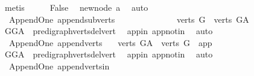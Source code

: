 \begin{isabellebody}
\ metis\isanewline
\ \ \isamarkupfalse%
\ \isamarkupfalse%
\ {\isachardoublequoteopen}False{\isachardoublequoteclose}\ \isamarkupfalse%
\ new{\isacharunderscore}{\kern0pt}node\ a{}\ \isamarkupfalse%
\ auto\isanewline
{}\isamarkupfalse%
%
\endisatagproof
{\isafoldproof}%
%
\isadelimproof
\isanewline
%
\endisadelimproof
\isanewline
\ \ \isanewline
\isanewline
\isanewline
{}\isamarkupfalse%
\ {\isacharparenleft}{\kern0pt}\ Append{\isacharunderscore}{\kern0pt}One{\isacharparenright}{\kern0pt}\ append{\isacharunderscore}{\kern0pt}subverts{\isacharcolon}{\kern0pt}\ \ \ \ \ \ \ \ \ \ \ \ \isanewline
\ \ {\isachardoublequoteopen}verts\ G\ {\isasymsubset}\ verts\ G{\isacharunderscore}{\kern0pt}A{\isachardoublequoteclose}\isanewline
%
\isadelimproof
\ \ %
\endisadelimproof
%
\isatagproof
{}\isamarkupfalse%
\ GG{\isacharunderscore}{\kern0pt}A\ \ pre{\isacharunderscore}{\kern0pt}digraph{\isachardot}{\kern0pt}verts{\isacharunderscore}{\kern0pt}del{\isacharunderscore}{\kern0pt}vert\ \isamarkupfalse%
\ app{\isacharunderscore}{\kern0pt}in\ app{\isacharunderscore}{\kern0pt}notin\ \isamarkupfalse%
\ auto%
\endisatagproof
{\isafoldproof}%
%
\isadelimproof
\isanewline
%
\endisadelimproof
\isanewline
{}\isamarkupfalse%
\ {\isacharparenleft}{\kern0pt}\ Append{\isacharunderscore}{\kern0pt}One{\isacharparenright}{\kern0pt}\ append{\isacharunderscore}{\kern0pt}verts{\isacharcolon}{\kern0pt}\ \isanewline
\ \ {\isachardoublequoteopen}verts\ G{\isacharunderscore}{\kern0pt}A\ {\isacharequal}{\kern0pt}\ verts\ G\ {\isasymunion}\ {\isacharbraceleft}{\kern0pt}app{\isacharbraceright}{\kern0pt}{\isachardoublequoteclose}\isanewline
%
\isadelimproof
\ \ %
\endisadelimproof
%
\isatagproof
{}\isamarkupfalse%
\ GG{\isacharunderscore}{\kern0pt}A\ \ pre{\isacharunderscore}{\kern0pt}digraph{\isachardot}{\kern0pt}verts{\isacharunderscore}{\kern0pt}del{\isacharunderscore}{\kern0pt}vert\ \isamarkupfalse%
\ app{\isacharunderscore}{\kern0pt}in\ app{\isacharunderscore}{\kern0pt}notin\ \isamarkupfalse%
\ auto%
\endisatagproof
{\isafoldproof}%
%
\isadelimproof
\isanewline
%
\endisadelimproof
\isanewline
{}\isamarkupfalse%
\ {\isacharparenleft}{\kern0pt}\ Append{\isacharunderscore}{\kern0pt}One{\isacharparenright}{\kern0pt}\ append{\isacharunderscore}{\kern0pt}verts{\isacharunderscore}{\kern0pt}in{\isacharcolon}{\kern0pt}\ \isanewline

\end{isabellebody}

